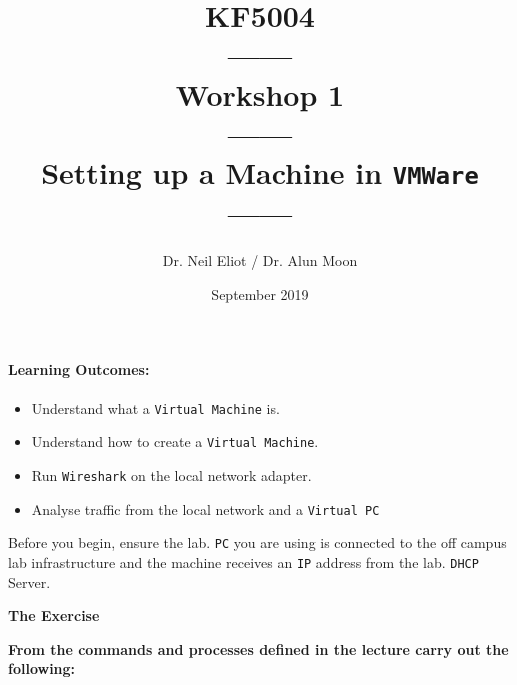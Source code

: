 \documentclass[11pt]{article}
\begin{document}
\author{Dr. Neil Eliot / Dr. Alun Moon}
\title{KF5004\\------\\Workshop 1\\------\\Setting up a Machine in \texttt{VMWare}\\------}
\date{September 2019}
\maketitle

\newpage



\paragraph{Learning Outcomes:}
\begin{itemize}
\item Understand what a \texttt{Virtual Machine} is.
\item Understand how to create a \texttt{Virtual Machine}.
\item Run \texttt{Wireshark} on the local network adapter.
\item Analyse traffic from the local network and a \texttt{Virtual PC}
\end{itemize}


\begin{tcolorbox}[title={\textbf{Important:}}]
    Before you begin, ensure the lab. \texttt{PC} you are using is connected to the off campus lab infrastructure and the machine receives an \texttt{IP} address from the lab. \texttt{DHCP} Server.
\end{tcolorbox}
\newpage

\noindent\textbf{The Exercise}\\
\begin{tcolorbox}[colback=blue!20]
    \noindent\textbf{From the commands and processes defined in the lecture carry out the following:}
\end{tcolorbox}
\end{document}
